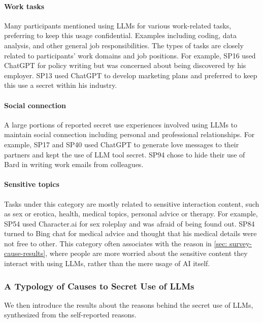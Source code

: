 \paragraph{Work tasks}
Many participants mentioned using LLMs for various work-related tasks, preferring to keep this usage confidential.
Examples including coding, data analysis, and other general job responsibilities.
The types of tasks are closely related to participants' work domains and job positions.
For example, SP16 used ChatGPT for policy writing but was concerned about being discovered by his employer.
SP13 used ChatGPT to develop marketing plans and preferred to keep this use a secret within his industry.

\paragraph{Social connection}
A large portions of reported secret use experiences involved using LLMs to maintain social connection including personal and professional relationships.
For example, SP17 and SP40 used ChatGPT to generate love messages to their partners and kept the use of LLM tool secret.
SP94 chose to hide their use of Bard in writing work emails from colleagues.


\paragraph{Sensitive topics}
Tasks under this category are mostly related to sensitive interaction content, such as sex or erotica, health, medical topics, personal advice or therapy.
For example, SP54 used Character.ai for sex roleplay and was afraid of being found out.
SP84 turned to Bing chat for medical advice and thought that his medical details were not free to other. 
This category often associates with the reason  in \autoref{sec: survey-cause-results}, where people are more worried about the sensitive content they interact with using LLMs, rather than the mere usage of AI itself.



\subsubsection{A Typology of Causes to Secret Use of LLMs}
\label{sec: survey-cause-results}
We then introduce the results about the reasons behind the secret use of LLMs, synthesized from the self-reported reasons.

